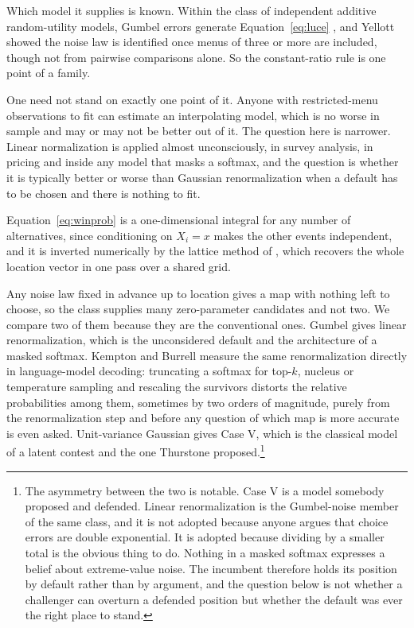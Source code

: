 \documentclass[11pt]{article}
\begin{document}
Which model it supplies is known. Within the class of independent additive random-utility
models, Gumbel errors generate Equation~\eqref{eq:luce}
\cite{lucesuppes1965,holman1974}, and Yellott \cite{yellott1977} showed the noise law is
identified once menus of three or more are included, though not from pairwise comparisons
alone. So the constant-ratio rule is one point of a family.

One need not stand on exactly one point of it. Anyone with restricted-menu observations to fit
can estimate an interpolating model, which is no worse in sample and may or may not be better
out of it. The question here is narrower.
Linear normalization is applied almost unconsciously, in survey analysis, in pricing and inside
any model that masks a softmax, and the question is whether it is typically better or worse
than Gaussian renormalization when a default has to be chosen and there is nothing to fit.

Equation~\eqref{eq:winprob} is a one-dimensional integral for any number of alternatives,
since conditioning on $X_i = x$ makes the other events independent, and it is inverted
numerically by the lattice method of \cite{cotton2021}, which recovers the whole location
vector in one pass over a shared grid.

Any noise law fixed in advance up to location gives a map with nothing left to choose, so the
class supplies many zero-parameter candidates and not two. We compare two of them because they
are the conventional ones. Gumbel gives linear renormalization, which is the unconsidered default
and the architecture of a masked softmax. Kempton and Burrell \cite{kemptonburrell2025} measure
the same renormalization directly in language-model decoding: truncating a softmax for top-$k$,
nucleus or temperature sampling and rescaling the survivors distorts the relative probabilities
among them, sometimes by two orders of magnitude, purely from the renormalization step and
before any question of which map is more accurate is even asked. Unit-variance Gaussian gives
Case V, which is the classical
model of a latent contest and the one Thurstone proposed.\footnote{The asymmetry between the two
is notable. Case V is a model somebody proposed and defended. Linear renormalization is the
Gumbel-noise member of the same class, and it is not adopted because anyone argues that choice
errors are double exponential. It is adopted because dividing by a smaller total is the obvious
thing to do. Nothing in a masked softmax expresses a belief about extreme-value noise. The
incumbent therefore holds its position by default rather than by argument, and the question below
is not whether a challenger can overturn a defended position but whether the default was ever the
right place to stand.}
\end{document}
